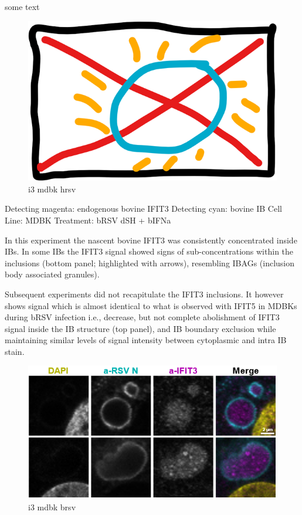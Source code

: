  \label{bIFIT3 Localisation During h/bRSV Infection}
some text

\begin{figure}
    \centering
    \includegraphics[width=0.5\linewidth]{06. Chapter 1//Figs/00. placeholder.png}
    \caption[i3 mdbk hrsv]{i3 mdbk hrsv}
    \label{i3 mdbk hrsv}
\end{figure}

Detecting magenta: endogenous bovine IFIT3 \newline
Detecting cyan: bovine IB \newline
Cell Line: MDBK \newline
Treatment: bRSV dSH + bIFNa \newline

In this experiment the nascent bovine IFIT3 was consistently concentrated inside IBs. In some IBs the IFIT3 signal showed signs of sub-concentrations within the inclusions (bottom panel; highlighted with arrows), resembling IBAGs (inclusion body associated granules).

Subsequent experiments did not recapitulate the IFIT3 inclusions. It however shows signal which is almost identical to what is observed with IFIT5 in MDBKs during bRSV infection i.e., decrease, but not complete abolishment of IFIT3 signal inside the IB structure (top panel), and IB boundary exclusion while maintaining similar levels of signal intensity between cytoplasmic and intra IB stain.

\begin{figure}
    \centering
    \includegraphics[width=1\linewidth]{08. Chapter 3/Figs/04. IFIT3/04. mdbk brsv.png}
    \caption[i3 mdbk brsv]{i3 mdbk brsv}
    \label{i3 mdbk brsv}
\end{figure}


